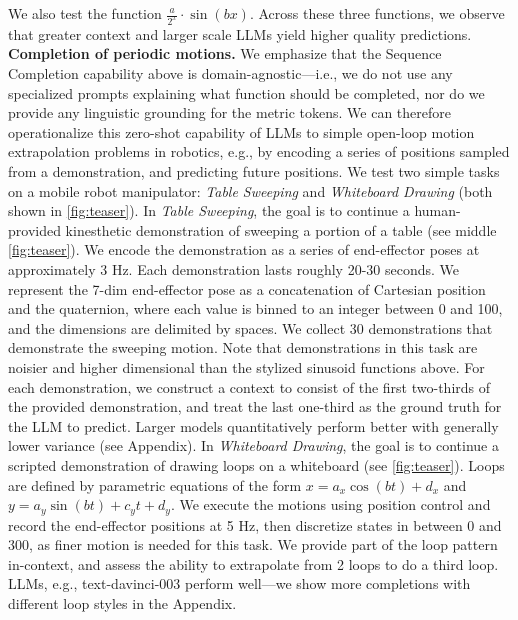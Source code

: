 \documentclass{article}
\newcommand{\ie}{i.e., }
\newcommand{\eg}{e.g., }
\begin{document}
We also test the function $\frac{a}{2^x} \cdot\sin{(bx)}$. Across these three functions, we observe that greater context and larger scale LLMs yield higher quality predictions.
\textbf{Completion of periodic motions.} We emphasize that the Sequence Completion capability above is domain-agnostic---\ie we do not use any specialized prompts explaining what function should be completed, nor do we provide any linguistic grounding for the metric tokens. We can therefore operationalize this zero-shot capability of LLMs to simple open-loop motion extrapolation problems in robotics, \eg by encoding a series of positions sampled from a demonstration, and predicting future positions. We test two simple tasks on a mobile robot manipulator: \textit{Table Sweeping} and \textit{Whiteboard Drawing} (both shown in \cref{fig:teaser}).
In \textit{Table Sweeping}, the goal is to continue a human-provided kinesthetic demonstration of sweeping a portion of a table (see middle \cref{fig:teaser}). We encode the demonstration as a series of end-effector poses at approximately 3 Hz. Each demonstration lasts roughly 20-30 seconds. We represent the 7-dim end-effector pose as a concatenation of Cartesian position and the quaternion, where each value is binned to an integer between 0 and 100, and the dimensions are delimited by spaces. We collect 30 demonstrations that demonstrate the sweeping motion. Note that demonstrations in this task are noisier and higher dimensional than the stylized sinusoid functions above. For each demonstration, we construct a context to consist of the first two-thirds of the provided demonstration, and treat the last one-third as the ground truth for the LLM to predict. Larger models quantitatively perform better with generally lower variance (see Appendix).
In \textit{Whiteboard Drawing}, the goal is to continue a scripted demonstration of drawing loops on a whiteboard (see \cref{fig:teaser}). Loops are defined by parametric equations of the form $x = a_x \cos(bt) + d_x$ and $y = a_y \sin(bt) + c_y t + d_y$. We execute the motions using position control and record the end-effector positions at 5 Hz, then discretize states in between 0 and 300, as finer motion is needed for this task. We provide part of the loop pattern in-context, and assess the ability to extrapolate from 2 loops to do a third loop. LLMs, \eg text-davinci-003 perform well---we show more completions with different loop styles in the Appendix.
\vspace{-3mm}
\end{document}
